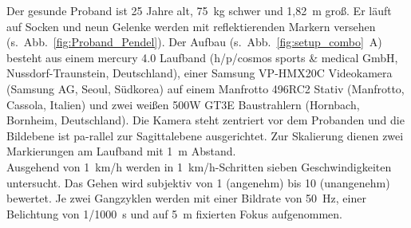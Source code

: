 Der gesunde Proband ist 25 Jahre alt, 75~kg schwer und 1,82~m groß. Er läuft auf Socken und neun Gelenke werden mit reflektierenden Markern versehen (s.~Abb.~\ref{fig:Proband_Pendel}). Der Aufbau (s.~Abb.~\ref{fig:setup_combo}~A) besteht aus einem mercury 4.0 Laufband (h/p/cosmos sports \& medical GmbH, Nussdorf-Traunstein, Deutschland), einer Samsung VP-HMX20C Videokamera (Samsung AG, Seoul, Südkorea) auf einem Manfrotto 496RC2 Stativ (Manfrotto, Cassola, Italien) und zwei weißen 500W GT3E Baustrahlern (Hornbach, Bornheim, Deutschland). Die Kamera steht zentriert vor dem Probanden und die Bildebene ist pa-rallel zur Sagittalebene ausgerichtet. Zur Skalierung dienen zwei Markierungen am Laufband mit 1~m Abstand.\\
Ausgehend von 1~km/h werden in 1~km/h-Schritten sieben Geschwindigkeiten untersucht. Das Gehen wird subjektiv von 1 (angenehm) bis 10 (unangenehm) bewertet. Je zwei Gangzyklen werden mit einer Bildrate von 50~Hz, einer Belichtung von 1/1000~s und auf 5~m fixierten Fokus aufgenommen.\\

